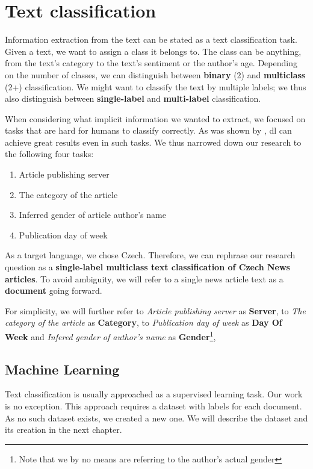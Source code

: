 \chapter{Text classification}
Information extraction from the text can be stated as a text classification task.
Given a text, we want to assign a class it belongs to.
The class can be anything, from the text's category to the text's sentiment or the author's age.
Depending on the number of classes, we can distinguish between \textbf{binary} (2) and \textbf{multiclass} (2+) classification.
We might want to classify the text by multiple labels; we thus also distinguish between \textbf{single-label}
and \textbf{multi-label} classification.


When considering what implicit information we wanted to extract, we focused on tasks
that are hard for humans to classify correctly. As was shown by \textcite{wangDeepNeuralNetworks2017},
\ac{dl} can achieve great results even in such tasks.
We thus narrowed down our research to the following four tasks:
\begin{enumerate}
    \item Article publishing server
    \item The category of the article
    \item Inferred gender of article author's name
    \item Publication day of week
\end{enumerate}
As a target language, we chose Czech.
Therefore, we can rephrase our research question as a \textbf{single-label multiclass text classification of Czech News articles}.
To avoid ambiguity, we will refer to a single news article text as a \textbf{document} going forward.

For simplicity, we will further refer
to \textit{Article publishing server} as \textbf{Server},
to \textit{The category of the article} as \textbf{Category},
to \textit{Publication day of week} as \textbf{Day Of Week}
and \textit{Infered gender of author's name} as \textbf{Gender}\footnote{Note that we by no means are referring to the author's actual gender},

\section{Machine Learning}
Text classification is usually approached as a supervised learning task. Our work is no exception.
This approach requires a dataset with labels for each document.
As no such dataset exists, we created a new one.
We will describe the dataset and its creation in the next chapter.

